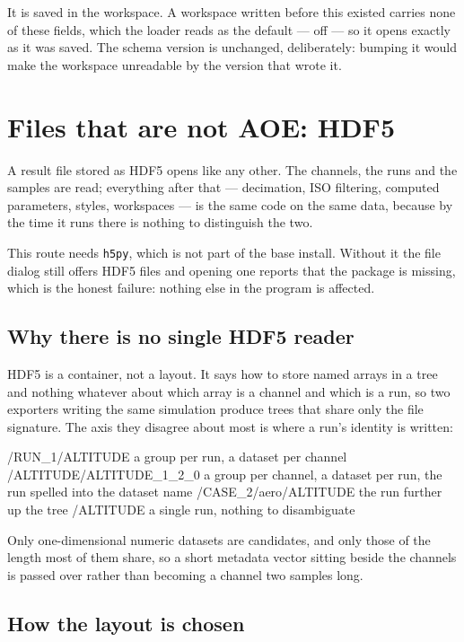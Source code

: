 \documentclass[11pt,a4paper,oneside]{report}
\newcommand{\code}[1]{\texttt{#1}}
\begin{document}
It is saved in the workspace. A workspace written before this existed carries
none of these fields, which the loader reads as the default --- off --- so it
opens exactly as it was saved. The schema version is unchanged, deliberately:
bumping it would make the workspace unreadable by the version that wrote it.

\section{Files that are not AOE: HDF5}
\label{sec:hdf5}

A result file stored as HDF5 opens like any other. The channels, the runs and
the samples are read; everything after that --- decimation, ISO filtering,
computed parameters, styles, workspaces --- is the same code on the same data,
because by the time it runs there is nothing to distinguish the two.

This route needs \code{h5py}, which is not part of the base install. Without it
the file dialog still offers HDF5 files and opening one reports that the package
is missing, which is the honest failure: nothing else in the program is
affected.

\subsection*{Why there is no single HDF5 reader}

HDF5 is a container, not a layout. It says how to store named arrays in a tree
and nothing whatever about which array is a channel and which is a run, so two
exporters writing the same simulation produce trees that share only the file
signature. The axis they disagree about most is where a run's identity is
written:

\begin{aoecode}
/RUN_1/ALTITUDE            a group per run, a dataset per channel
/ALTITUDE/ALTITUDE_1_2_0   a group per channel, a dataset per run, the
                           run spelled into the dataset name
/CASE_2/aero/ALTITUDE      the run further up the tree
/ALTITUDE                  a single run, nothing to disambiguate
\end{aoecode}

Only one-dimensional numeric datasets are candidates, and only those of the
length most of them share, so a short metadata vector sitting beside the
channels is passed over rather than becoming a channel two samples long.

\subsection*{How the layout is chosen}
\end{document}
